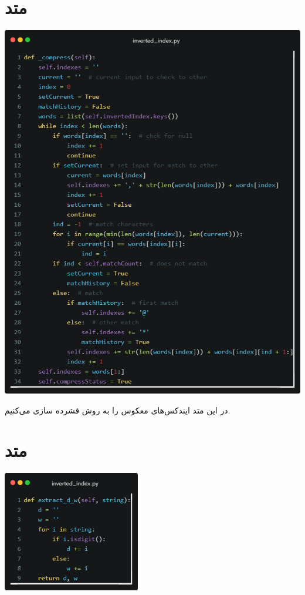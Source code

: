 \documentclass[12pt, dvipsnames, svgnames, x11names,]{article}
\begin{document}
	
	
	\section{متد }
	
		\includegraphics[width=14cm]{images/4.png} \par
		\vspace{0.2cm}
		{\normalsize 
			در این متد ایندکس‌های معکوس را به روش  فشرده سازی می‌کنیم.
		}
		
	
	
	\section{متد }
		
		\begin{center}
			\includegraphics[width=6cm]{images/5.png} \par
		\end{center}
		
\end{document}
